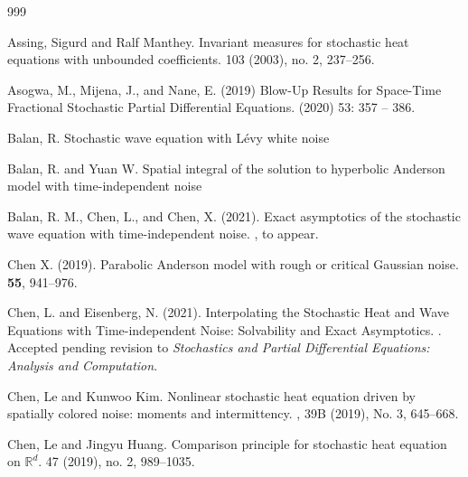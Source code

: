 \documentclass[a4paper,11pt]{article}
\numberwithin{equation}{section}
\theoremstyle{plain}
\theoremstyle{definition}
\newcommand{\R}{\mathbb{R}}
\numberwithin{NQ}{section}
\numberwithin{LQ}{section}
\numberwithin{ZQ}{section}
\begin{document}
\begin{thebibliography}{999}
	
	Assing, Sigurd and Ralf Manthey.
	\newblock Invariant measures for stochastic heat equations with unbounded coefficients.
	 103 (2003), no. 2, 237--256.
	
	Asogwa, M., Mijena, J., and Nane, E. (2019)
	\newblock Blow-Up Results for Space-Time Fractional Stochastic Partial Differential Equations.
	 (2020) 53: 357 -- 386. 
	
	Balan, R.
	\newblock Stochastic wave equation with L\'evy white noise
	
	Balan, R. and Yuan W. 
	\newblock Spatial integral of the solution to hyperbolic Anderson model with time-independent noise
	
	
	Balan, R. M., Chen, L., and Chen, X. (2021).
	\newblock Exact asymptotics of the stochastic wave equation with time-independent noise.
	, to appear.
	
	Chen X. (2019).
	\newblock Parabolic Anderson model with rough or critical Gaussian noise.
	 \textbf{55}, 941--976.
	
	Chen, L. and Eisenberg, N. (2021).
	\newblock Interpolating the Stochastic Heat and Wave Equations with Time-independent Noise: Solvability and Exact Asymptotics.
	. Accepted pending revision to {\em Stochastics and  Partial Differential Equations: Analysis and Computation}.
	
	Chen, Le and Kunwoo Kim.
	\newblock Nonlinear stochastic heat equation driven by spatially colored noise: moments and intermittency.
	, 39B (2019), No. 3, 645--668.
	
	Chen, Le and Jingyu Huang.
	\newblock Comparison principle for stochastic heat equation on $\R^d$.
	  47 (2019), no. 2, 989--1035.
	

\end{thebibliography}
\end{document}
